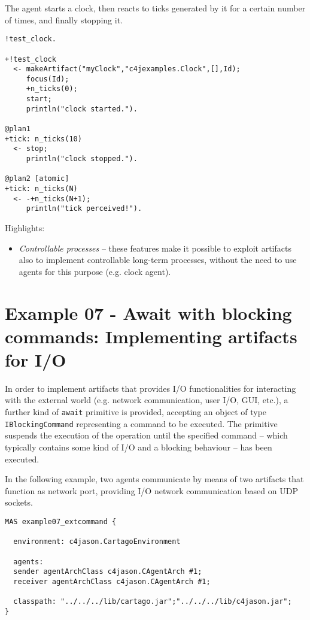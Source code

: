 \documentclass[11pt]{report}
\newcommand\code[1]{{\small{\mbox{\texttt{{#1}}}}}}
\begin{document}
The agent starts a clock, then reacts to ticks generated by it for a certain number of times, and finally  stopping it.
%
%
{\small{\begin{verbatim}
!test_clock.

+!test_clock
  <- makeArtifact("myClock","c4jexamples.Clock",[],Id);
     focus(Id);
     +n_ticks(0);
     start;
     println("clock started.").

@plan1
+tick: n_ticks(10)  
  <- stop;
     println("clock stopped.").

@plan2 [atomic]
+tick: n_ticks(N)  
  <- -+n_ticks(N+1);
     println("tick perceived!").
\end{verbatim}}}

\noindent Highlights:
%
\begin{itemize}
%
\item \emph{Controllable processes} -- these features make it possible to exploit artifacts also to implement controllable long-term processes, without the need to use agents for this purpose (e.g. clock agent).
%
\end{itemize} 


\newpage
\section{Example 07 - Await with blocking commands: Implementing  artifacts for I/O}

In order to implement artifacts that provides I/O functionalities for interacting with the external world (e.g. network communication, user I/O, GUI, etc.), a further kind of \code{await} primitive is provided, accepting an object of type \code{IBlockingCommand} representing a command to be executed.
%
The primitive suspends the execution of the operation until the specified command -- which typically contains some kind of I/O and a blocking behaviour -- has been executed.
%

\noindent In the following example, two agents communicate by means of two artifacts that function as network port, providing I/O network communication based on UDP sockets.
 
{\small{
\begin{verbatim}
MAS example07_extcommand {

  environment: c4jason.CartagoEnvironment

  agents:  
  sender agentArchClass c4jason.CAgentArch #1;
  receiver agentArchClass c4jason.CAgentArch #1;

  classpath: "../../../lib/cartago.jar";"../../../lib/c4jason.jar";    
}
\end{verbatim}}}
\end{document}
